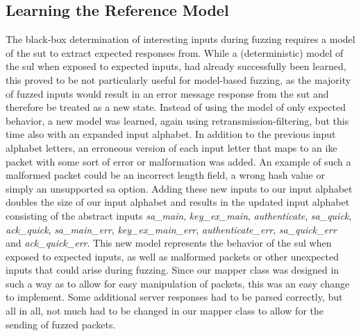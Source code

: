 \subsection{Learning the Reference Model} \label{subsec:adapting_model}
The black-box determination of interesting inputs during fuzzing requires a model of the \ac{sut} to extract expected responses from. While a (deterministic) model of the \ac{sul} when exposed to expected inputs, had already successfully been learned, this proved to be not particularly useful for model-based fuzzing, as the majority of fuzzed inputs would result in an error message response from the \ac{sut} and therefore be treated as a new state. Instead of using the model of only expected behavior, a new model was learned, again using retransmission-filtering, but this time also with an expanded input alphabet. In addition to the previous input alphabet letters, an erroneous version of each input letter that maps to an \ac{ike} packet with some sort of error or malformation was added. An example of such a malformed packet could be an incorrect length field, a wrong hash value or simply an unsupported \ac{sa} option. Adding these new inputs to our input alphabet doubles the size of our input alphabet and results in the updated input alphabet consisting of the abstract inputs \emph{sa\_main}, \emph{key\_ex\_main}, \emph{authenticate}, \emph{sa\_quick}, \emph{ack\_quick}, \emph{sa\_main\_err}, \emph{key\_ex\_main\_err}, \emph{authenticate\_err}, \emph{sa\_quick\_err} and \emph{ack\_quick\_err}. This new model represents the behavior of the \ac{sul} when exposed to expected inputs, as well as malformed packets or other unexpected inputs that could arise during fuzzing. Since our mapper class was designed in such a way as to allow for easy manipulation of packets, this was an easy change to implement. Some additional server responses had to be parsed correctly, but all in all, not much had to be changed in our mapper class to allow for the sending of fuzzed packets. 


